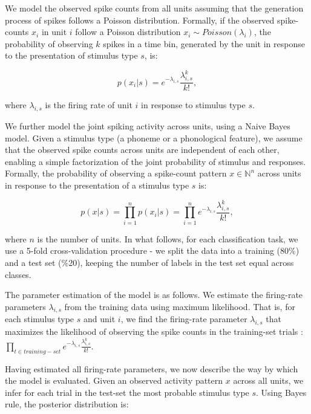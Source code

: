 We model the observed spike counts from all units assuming that the generation process of spikes follows a Poisson distribution. Formally, if the observed spike-counts $x_i$ in unit $i$ follow a Poisson distribution $x_i \sim Poisson(\lambda_i)$, the probability of observing $k$ spikes in a time bin, generated by the unit in response to the presentation of stimulus type $s$, is:

\begin{equation}
    p(x_i|s)=e^{-\lambda_{i,s}}\frac{\lambda_{i,s}^k}{k!},
\end{equation}

where $\lambda_{i,s}$ is the firing rate of unit $i$ in response to stimulus type $s$. 

We further model the joint spiking activity across units, using a Naive Bayes model. Given a stimulus type (a phoneme or a phonological feature), we assume that the observed spike counts across units are independent of each other, enabling a simple factorization of the joint probability of stimulus and responses. Formally, the probability of observing a spike-count pattern $x \in \mathbb{N}^n$ across units in response to the presentation of a stimulus type $s$ is:

\begin{equation}
    p(x|s)=\prod_{i=1}^n{p(x_i |s)}=\prod_{i=1}^n{e^{-\lambda_{i,s}}\frac{\lambda_{i,s}^k}{k!}},
\end{equation}

where $n$ is the number of units. In what follows, for each classification task, we use a 5-fold cross-validation procedure - we split the data into a training (80\%) and a test set (\%20), keeping the number of labels in the test set equal across classes.

The parameter estimation of the model is as follows. We estimate the firing-rate parameters $\lambda_{i,s}$ from the training data using maximum likelihood. That is, for each stimulus type $s$ and unit $i$, we find the firing-rate parameter $\lambda_{i,s}$ that maximizes the likelihood of observing the spike counts in the training-set trials :$\prod_{t \in training-set}{e^{-\lambda_{i,s}}\frac{\lambda_{i,s}^k}{k!}}$.
 
Having estimated all firing-rate parameters, we now describe the way by which the model is evaluated. Given an observed activity pattern $x$ across all units, we infer for each trial in the test-set the most probable stimulus type $s$. Using Bayes rule, the posterior distribution is: 

